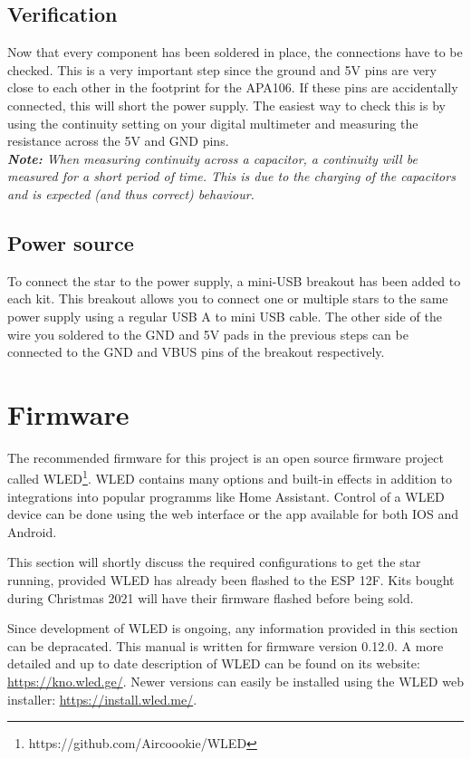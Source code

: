 \documentclass[12pt]{article}
\begin{document}
\subsection{Verification}
Now that every component has been soldered in place, the connections have to be checked.
This is a very important step since the ground and 5V pins are very close to each other in the footprint for the APA106.
If these pins are accidentally connected, this will short the power supply.
The easiest way to check this is by using the continuity setting on your digital multimeter and measuring the resistance across the 5V and GND pins.\\

\vspace{1ex}
\textit{\textbf{Note:} When measuring continuity across a capacitor, a continuity will be measured for a short period of time. This is due to the charging of the capacitors and is expected (and thus correct) behaviour.}

\subsection{Power source}
To connect the star to the power supply, a mini-USB breakout has been added to each kit. This breakout allows you to connect one or multiple stars to the same power supply using a regular USB A to mini USB cable. The other side of the wire you soldered to the GND and 5V pads in the previous steps can be connected to the GND and VBUS pins of the breakout respectively.



\section{Firmware}
\label{sec:firmware}
The recommended firmware for this project is an open source firmware project called WLED\footnote{https://github.com/Aircoookie/WLED}. WLED contains many options and built-in effects in addition to integrations into popular programms like Home Assistant. Control of a WLED device can be done using the web interface or the app available for both IOS and Android.\\\hfill

\noindent This section will shortly discuss the required configurations to get the star running, provided WLED has already been flashed to the ESP 12F. Kits bought during Christmas 2021 will have their firmware flashed before being sold.

Since development of WLED is ongoing, any information provided in this section can be depracated. This manual is written for firmware version 0.12.0.
A more detailed and up to date description of WLED can be found on its website: \url{https://kno.wled.ge/}. Newer versions can easily be installed using the WLED web installer: \url{https://install.wled.me/}.
\end{document}
